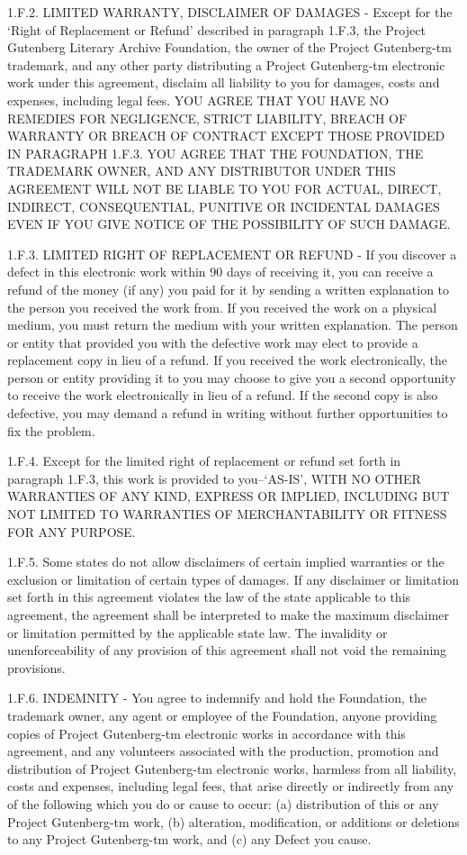 \documentclass[oneside]{book}
\begin{document}
1.F.2. LIMITED WARRANTY, DISCLAIMER OF DAMAGES - Except for the `Right
of Replacement or Refund' described in paragraph 1.F.3, the Project
Gutenberg Literary Archive Foundation, the owner of the Project
Gutenberg-tm trademark, and any other party distributing a Project
Gutenberg-tm electronic work under this agreement, disclaim all
liability to you for damages, costs and expenses, including legal
fees. YOU AGREE THAT YOU HAVE NO REMEDIES FOR NEGLIGENCE, STRICT
LIABILITY, BREACH OF WARRANTY OR BREACH OF CONTRACT EXCEPT THOSE
PROVIDED IN PARAGRAPH 1.F.3. YOU AGREE THAT THE FOUNDATION, THE
TRADEMARK OWNER, AND ANY DISTRIBUTOR UNDER THIS AGREEMENT WILL NOT BE
LIABLE TO YOU FOR ACTUAL, DIRECT, INDIRECT, CONSEQUENTIAL, PUNITIVE OR
INCIDENTAL DAMAGES EVEN IF YOU GIVE NOTICE OF THE POSSIBILITY OF SUCH
DAMAGE.

1.F.3. LIMITED RIGHT OF REPLACEMENT OR REFUND - If you discover a
defect in this electronic work within 90 days of receiving it, you can
receive a refund of the money (if any) you paid for it by sending a
written explanation to the person you received the work from. If you
received the work on a physical medium, you must return the medium
with your written explanation. The person or entity that provided you
with the defective work may elect to provide a replacement copy in
lieu of a refund. If you received the work electronically, the person
or entity providing it to you may choose to give you a second
opportunity to receive the work electronically in lieu of a refund. If
the second copy is also defective, you may demand a refund in writing
without further opportunities to fix the problem.

1.F.4. Except for the limited right of replacement or refund set forth
in paragraph 1.F.3, this work is provided to you--`AS-IS', WITH NO
OTHER WARRANTIES OF ANY KIND, EXPRESS OR IMPLIED, INCLUDING BUT NOT
LIMITED TO WARRANTIES OF MERCHANTABILITY OR FITNESS FOR ANY PURPOSE.

1.F.5. Some states do not allow disclaimers of certain implied
warranties or the exclusion or limitation of certain types of
damages. If any disclaimer or limitation set forth in this agreement
violates the law of the state applicable to this agreement, the
agreement shall be interpreted to make the maximum disclaimer or
limitation permitted by the applicable state law. The invalidity or
unenforceability of any provision of this agreement shall not void the
remaining provisions.

1.F.6. INDEMNITY - You agree to indemnify and hold the Foundation, the
trademark owner, any agent or employee of the Foundation, anyone
providing copies of Project Gutenberg-tm electronic works in
accordance with this agreement, and any volunteers associated with the
production, promotion and distribution of Project Gutenberg-tm
electronic works, harmless from all liability, costs and expenses,
including legal fees, that arise directly or indirectly from any of
the following which you do or cause to occur: (a) distribution of this
or any Project Gutenberg-tm work, (b) alteration, modification, or
additions or deletions to any Project Gutenberg-tm work, and (c) any
Defect you cause.
\end{document}
